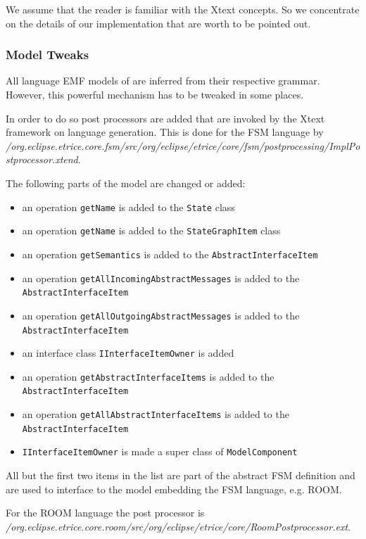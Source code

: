 We assume that the reader is familiar with the Xtext concepts. So we concentrate on the details of our 
implementation that are worth to be pointed out.

\subsubsection*{Model Tweaks}

All language EMF models of \eTrice{} are inferred from their respective grammar.
However, this powerful mechanism has to be tweaked in some places.

In order to do so post processors are added that are invoked by the Xtext framework on language generation.
This is done for the FSM language by \textit{/org.eclipse.etrice.core.fsm/src/org/eclipse/etrice/core/fsm/postprocessing/ImplPostprocessor.xtend}.

The following parts of the model are changed or added:
\begin{itemize}
\item an operation \texttt{getName} is added to the \texttt{State} class
\item an operation \texttt{getName} is added to the \texttt{StateGraphItem} class
\item an operation \texttt{getSemantics} is added to the \texttt{AbstractInterfaceItem}
\item an operation \texttt{getAllIncomingAbstractMessages} is added to the \texttt{AbstractInterfaceItem}
\item an operation \texttt{getAllOutgoingAbstractMessages} is added to the \texttt{AbstractInterfaceItem}
\item an interface class \texttt{IInterfaceItemOwner} is added
\item an operation \texttt{getAbstractInterfaceItems} is added to the \texttt{AbstractInterfaceItem}
\item an operation \texttt{getAllAbstractInterfaceItems} is added to the \texttt{AbstractInterfaceItem}
\item \texttt{IInterfaceItemOwner} is made a super class of \texttt{ModelComponent}
\end{itemize}
All but the first two items in the list are part of the abstract FSM definition and are used to interface
to the model embedding the FSM language, e.g. ROOM.

For the ROOM language the post processor is
\textit{/org.eclipse.etrice.core.room/src/org/eclipse/etrice/core/RoomPostprocessor.ext}.

